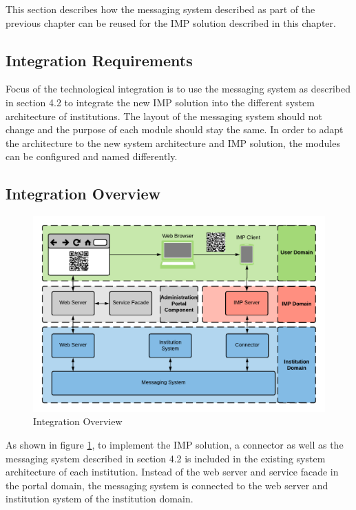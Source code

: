 This section describes how the messaging system described as part of the previous chapter can be reused for the IMP solution described in this chapter.

\subsection{Integration Requirements}

Focus of the technological integration is to use the messaging system as described in section 4.2 to integrate the new IMP solution into the different system architecture of institutions. The layout of the messaging system should not change and the purpose of each module should stay the same. In order to adapt the architecture to the new system architecture and IMP solution, the modules can be configured and named differently.

\subsection{Integration Overview}

\begin{figure}[h]
    \centering
    \includegraphics[scale=0.6]{Diagrams/Integration Architecture 2/Technological Integration/1. Integration Overview.pdf}
    \caption{Integration Overview}
    \label{integration2:integration_overview}
\end{figure}

As shown in figure \ref{integration2:integration_overview}, to implement the IMP solution, a connector as well as the messaging system described in section 4.2 is included in the existing system architecture of each institution. Instead of the web server and service facade in the portal domain, the messaging system is connected to the web server and institution system of the institution domain.

